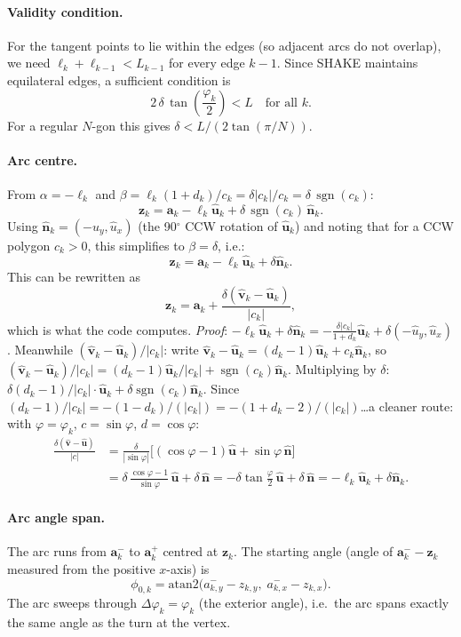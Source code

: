 \documentclass[12pt]{article}
\newcommand{\uvec}{\hat{\mathbf{u}}}
\newcommand{\vvec}{\hat{\mathbf{v}}}
\newcommand{\nvec}{\hat{\mathbf{n}}}
\DeclareMathOperator{\sgn}{sgn}
\begin{document}
\paragraph{Validity condition.}
For the tangent points to lie within the edges (so adjacent arcs do not overlap),
we need $\ell_k + \ell_{k-1} < L_{k-1}$ for every edge $k-1$.  Since SHAKE maintains
equilateral edges, a sufficient condition is
\[
  2\,\delta\,\tan\!\left(\frac{\varphi_k}{2}\right) < L \quad \text{for all } k.
\]
For a regular $N$-gon this gives $\delta < L/(2\tan(\pi/N))$.

\paragraph{Arc centre.}
From $\alpha = -\ell_k$ and $\beta = \ell_k(1+d_k)/c_k = \delta|c_k|/c_k = \delta\,\sgn(c_k)$:
\[
  \mathbf{z}_k = \mathbf{a}_k - \ell_k \uvec_k + \delta\,\sgn(c_k)\, \nvec_k.
\]
Using $\nvec_k = (-\hat u_y, \hat u_x)$ (the 90$^\circ$ CCW rotation of $\uvec_k$) and
noting that for a CCW polygon $c_k > 0$, this simplifies to $\beta = \delta$, i.e.:
\[
  \mathbf{z}_k = \mathbf{a}_k - \ell_k \uvec_k + \delta\nvec_k.
\]
This can be rewritten as
\[
  \boxed{\mathbf{z}_k = \mathbf{a}_k + \frac{\delta(\vvec_k - \uvec_k)}{|c_k|},}
\]
which is what the code computes.  \emph{Proof}: $-\ell_k \uvec_k + \delta \nvec_k
= -\frac{\delta|c_k|}{1+d_k}\uvec_k + \delta(-\hat u_y, \hat u_x)$.
Meanwhile $(\vvec_k - \uvec_k)/|c_k|$: write $\vvec_k - \uvec_k = (d_k-1)\uvec_k + c_k\nvec_k$,
so $(\vvec_k-\uvec_k)/|c_k| = (d_k-1)\uvec_k/|c_k| + \sgn(c_k)\nvec_k$.
Multiplying by $\delta$: $\delta(d_k-1)/|c_k| \cdot \uvec_k + \delta\sgn(c_k)\nvec_k$.
Since $(d_k-1)/|c_k| = -(1-d_k)/(|c_k|) = -(1+d_k-2)/(|c_k|)$\ldots a cleaner route:
with $\varphi = \varphi_k$, $c = \sin\varphi$, $d = \cos\varphi$:
\begin{align*}
  \frac{\delta(\vvec-\uvec)}{|c|} &= \frac{\delta}{|\sin\varphi|}
    \bigl[(\cos\varphi - 1)\uvec + \sin\varphi\,\nvec\bigr] \\
  &= \delta\,\frac{\cos\varphi-1}{\sin\varphi}\,\uvec + \delta\,\nvec
   = -\delta\tan\!\tfrac{\varphi}{2}\,\uvec + \delta\,\nvec
   = -\ell_k\uvec_k + \delta\nvec_k.
\end{align*}

\paragraph{Arc angle span.}
The arc runs from $\mathbf{a}_k^-$ to $\mathbf{a}_k^+$ centred at $\mathbf{z}_k$.
The starting angle (angle of $\mathbf{a}_k^- - \mathbf{z}_k$ measured from the
positive $x$-axis) is
\[
  \phi_{0,k} = \mathrm{atan2}\!\bigl(a^-_{k,y} - z_{k,y},\; a^-_{k,x} - z_{k,x}\bigr).
\]
The arc sweeps through $\Delta\varphi_k = \varphi_k$ (the exterior angle), i.e.\
the arc spans exactly the same angle as the turn at the vertex.
\end{document}
